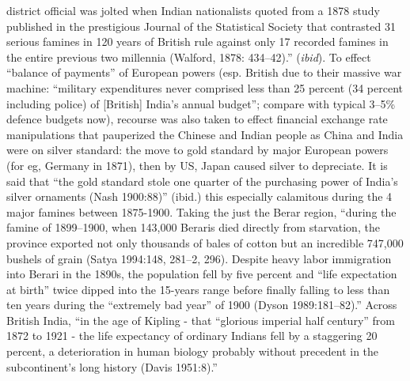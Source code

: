 district official was jolted when Indian nationalists quoted from a 1878 study published in the prestigious Journal of the Statistical Society that contrasted 31 serious famines in 120 years of British rule against only 17 recorded famines in the entire previous two millennia (Walford, 1878: 434–42).” ({\sl ibid}). To effect “balance of payments” of European powers (esp. British due to their massive war machine: “military expenditures never comprised less than 25 percent (34 percent including police) of [British] India’s annual budget”; compare with typical 3--5\% defence budgets now), recourse was also taken to effect financial exchange rate manipulations that pauperized the Chinese and Indian people as China and India were on silver standard: the move to gold standard by major European powers (for eg, Germany in 1871), then by US, Japan caused silver to depreciate. It is said that “the gold standard stole one quarter of the purchasing power of India’s silver ornaments (Nash 1900:88)” (ibid.) this especially calamitous during the 4 major famines between 1875-1900. Taking the just the Berar region, “during the famine of 1899–1900, when 143,000 Beraris died directly from starvation, the province exported not only thousands of bales of cotton but an incredible 747,000 bushels of grain (Satya 1994:148, 281–2, 296). Despite heavy labor immigration into Berari in the 1890s, the population fell by five percent and “life expectation at birth” twice dipped into the 15-years range before finally falling to less than ten years during the “extremely bad year” of 1900 (Dyson 1989:181–82).” Across British India, “in the age of Kipling - that “glorious imperial half century” from 1872 to 1921 - the life expectancy of ordinary Indians fell by a staggering 20 percent, a deterioration in human biology probably without precedent in the subcontinent’s long history (Davis 1951:8).” 

